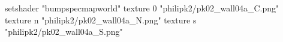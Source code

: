 setshader "bumpspecmapworld"
    texture 0 "philipk2/pk02_wall04a_C.png"
    texture n "philipk2/pk02_wall04a_N.png"
    texture s "philipk2/pk02_wall04a_S.png"